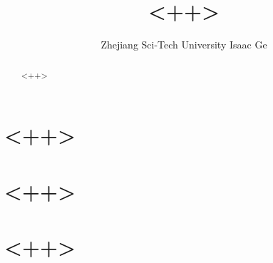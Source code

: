 \documentclass{article}
\title{<++>}
\author{Zhejiang Sci-Tech University Isaac Ge}
\begin{document}
\maketitle

\begin{abstract}
  <++>
\end{abstract}

\tableofcontents

\section{<++>}

\section{<++>}

\section{<++>}


\end{document}
